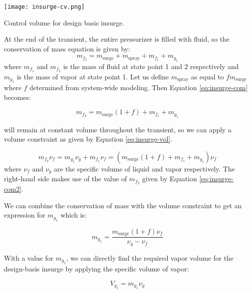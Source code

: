 \begin{marginfigure}
\texttt{[image: insurge-cv.png]}
\caption{Control volume for design basis insurge.}
\label{fig:insurge-cv}
\end{marginfigure}

At the end of the transient, the entire pressurizer is filled with fluid, so the conservation of mass equation is given by:
\begin{equation}
m_{f_2} = m_{\text{surge}} + m_{\text{spray}} + m_{f_1} + m_{g_1}
\label{eq:insurge-com}
\end{equation}
where $m_{f_1}$ and $m_{f_2}$ is the mass of fluid at state point 1 and 2 respectively and $m_{g_1}$ is the mass of vapor at state point 1.  Let us define $m_{\text{spray}}$ as equal to $f m_{\text{surge}}$ where $f$ determined from system-wide modeling.  Then Equation \ref{eq:insurge-com} becomes:

\begin{equation}
m_{f_2} = m_{\text{surge}}(1+f) + m_{f_1} + m_{g_1}
\label{eq:insurge-com2}
\end{equation}

 will remain at constant volume throughout the transient, so we can apply a volume constraint as given by Equation \ref{eq:insurge-vol}.

\begin{equation}
m_{f_2}\nu_f = m_{g_1} \nu_g + m_{f_1}\nu_f = (m_{\text{surge}}(1+f) + m_{f_1} + m_{g_1}) \nu_f
\label{eq:insurge-vol}
\end{equation}
where $\nu_f$ and $\nu_g$ are the specific volume of liquid and vapor respectively. The right-hand side makes use of the value of $m_{f_2}$ given by Equation \ref{eq:insurge-com2}.

We can combine the conservation of mass with the volume constraint to get an expression for $m_{g_1}$ which is:

\begin{equation}
m_{g_1} = \frac{m_{\text{surge}}(1+f)\nu_f}{\nu_g - \nu_f}
\label{eq:insurge-mg1}
\end{equation}

With a value for $m_{g_1}$, we can directly find the required vapor volume for the design-basis insurge by applying the specific volume of vapor:

\begin{equation}
V_{g_1} = m_{g_1}\nu_g
\label{eq:insurge-vg1}
\end{equation}

